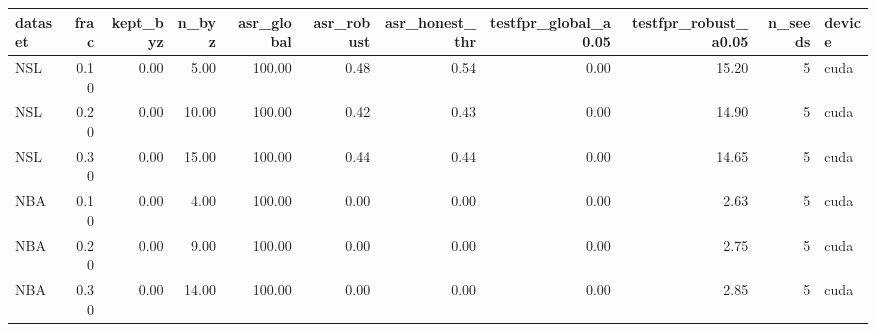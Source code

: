 \begin{tabular}{lrrrrrrrrrl}
\toprule
dataset & frac & kept\_byz & n\_byz & asr\_global & asr\_robust & asr\_honest\_thr & testfpr\_global\_a0.05 & testfpr\_robust\_a0.05 & n\_seeds & device \\
\midrule
NSL & 0.10 & 0.00 & 5.00 & 100.00 & 0.48 & 0.54 & 0.00 & 15.20 & 5 & cuda \\
NSL & 0.20 & 0.00 & 10.00 & 100.00 & 0.42 & 0.43 & 0.00 & 14.90 & 5 & cuda \\
NSL & 0.30 & 0.00 & 15.00 & 100.00 & 0.44 & 0.44 & 0.00 & 14.65 & 5 & cuda \\
NBA & 0.10 & 0.00 & 4.00 & 100.00 & 0.00 & 0.00 & 0.00 & 2.63 & 5 & cuda \\
NBA & 0.20 & 0.00 & 9.00 & 100.00 & 0.00 & 0.00 & 0.00 & 2.75 & 5 & cuda \\
NBA & 0.30 & 0.00 & 14.00 & 100.00 & 0.00 & 0.00 & 0.00 & 2.85 & 5 & cuda \\
\bottomrule
\end{tabular}

